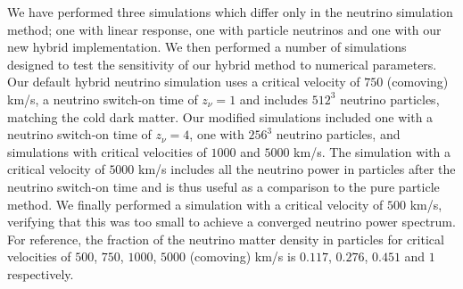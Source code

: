 \documentclass[useAMS, usenatbib]{mnras}
\begin{document}
We have performed three simulations which differ only in the neutrino simulation method; one with linear response, one with particle neutrinos and one with our new hybrid implementation. We then performed a number of simulations designed to test the sensitivity of our hybrid method to numerical parameters. Our default hybrid neutrino simulation uses a critical velocity of $750$ (comoving) km/s, a neutrino switch-on time of $z_\nu = 1$ and includes $512^3$ neutrino particles, matching the cold dark matter. Our modified simulations included one with a neutrino switch-on time of $z_\nu = 4$, one with $256^3$ neutrino particles, and simulations with critical velocities of $1000$ and $5000$ km/s. The simulation with a critical velocity of $5000$ km/s includes all the neutrino power in particles after the neutrino switch-on time and is thus useful as a comparison to the pure particle method. We finally performed a simulation with a critical velocity of $500$ km/s, verifying that this was too small to achieve a converged neutrino power spectrum.
For reference, the fraction of the neutrino matter density in particles for critical velocities of $500$, $750$, $1000$, $5000$ (comoving) km/s is $0.117$, $0.276$, $0.451$ and $1$ respectively.
\end{document}
